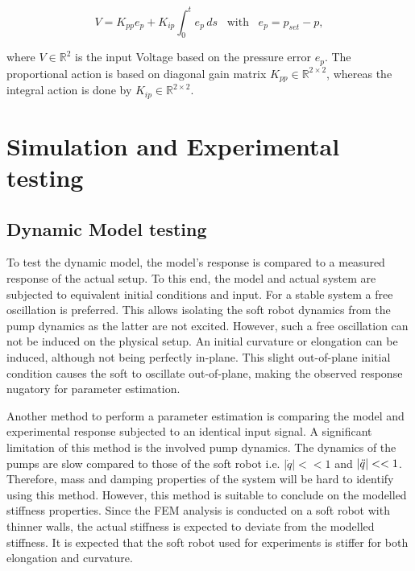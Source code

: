 \begin{equation}
    V = K_{pp}e_p + K_{ip} \int_0^t e_p \hspace{2pt} ds \hspace{10pt} \text{with} \hspace{10pt} e_p = p_{set} - p,
\end{equation}

where $V \in \mathbb{R}^2$ is the input Voltage based on the pressure error $e_p$. The proportional action is based on diagonal gain matrix $K_{pp} \in \mathbb{R}^{2\times 2}$, whereas the integral action is done by $K_{ip} \in \mathbb{R}^{2\times 2}$.







\label{chap4b}

\section{Simulation and Experimental testing}


\subsection{Dynamic Model testing}



To test the dynamic model, the model's response is compared to a measured response of the actual setup. To this end, the model and actual system are subjected to equivalent initial conditions and input. For a stable system a free oscillation is preferred. This allows isolating the soft robot dynamics from the pump dynamics as the latter are not excited. However, such a free oscillation can not be induced on the physical setup. An initial curvature or elongation can be induced, although not being perfectly in-plane. This slight out-of-plane initial condition causes the soft to oscillate out-of-plane, making the observed response nugatory for parameter estimation.


Another method to perform a parameter estimation is comparing the model and experimental response subjected to an identical input signal. A significant limitation of this method is the involved pump dynamics. The dynamics of the pumps are slow compared to those of the soft robot i.e. $|\dot{q}|<< 1$ and $|\Ddot{q}|<< 1 $. Therefore, mass and damping properties of the system will be hard to identify using this method. However, this method is suitable to conclude on the modelled stiffness properties. Since the FEM analysis is conducted on a soft robot with thinner walls, the actual stiffness is expected to deviate from the modelled stiffness. It is expected that the soft robot used for experiments is stiffer for both elongation and curvature. 

